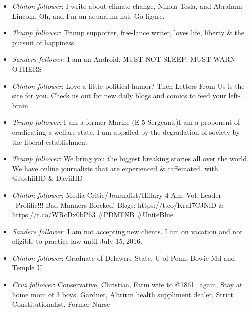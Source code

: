 \begin{itemize}  

\item\emph{Clinton follower}: I write about climate change, Nikola Tesla, and Abraham Lincoln. Oh, and I'm an aquarium nut. Go figure.

\item\emph{Trump follower}: Trump supporter, free-lance writer, loves life, liberty \& the pursuit of happiness

\item \emph{Sanders follower}: I am an Android. MUST NOT SLEEP; MUST WARN OTHERS

\item \emph{Clinton follower}: Love a little political humor? Then Letters From Us is the site for you. Check us out for new daily blogs and comics to feed your left-brain.

\item \emph{Trump follower}: I am a former Marine (E-5 Sergeant.)I am a proponent of eradicating a welfare state.  I am appalled by the degradation of society by the liberal establishment
 
\item \emph{Trump follower}: We bring you the biggest breaking stories all over the world. We have online journalists that are experienced \& caffeinated. with @JoshiiHD \& DaviiHD
 
\item \emph{Clinton follower}: Media Critic/Journalist/Hillary 4 Am. Vol. Leader ~Prolific!!! Bad Manners Blocked! Blogs: https://t.co/KraI7CJNlD \& https://t.co/WRcDx0bP63 \#PDMFNB \#UniteBlue
 
\item \emph{Sanders follower}: I am not accepting new clients. I am on vacation and not eligible to practice law until July 15, 2016.

\item \emph{Clinton follower}: Graduate of Delaware State, U of Penn, Bowie Md and Temple U

\item \emph{Cruz follower}: Conservative, Christian, Farm wife to @1861\_again, Stay at home mom of 3 boys, Gardner, Altrium health suppliment dealer, Strict Constitutionalist, Former Nurse

\end{itemize}



 

